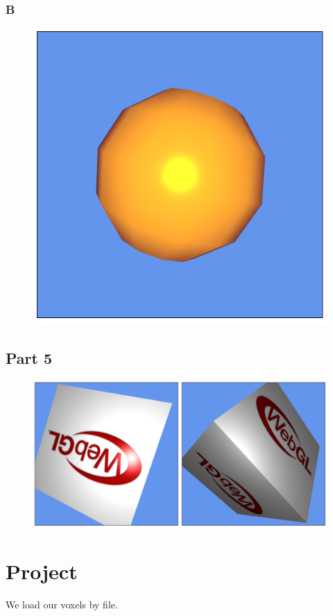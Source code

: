 \documentclass[11pt]{article}
\begin{document}
\subsubsection{B}
\begin{figure}[H]
	\centering
	\includegraphics[width=0.5\linewidth]{images/e12p4b}
	\label{fig:e12p4b}
\end{figure}

\subsection{Part 5}
\begin{figure}[H]
	\centering
	\includegraphics[width=0.5\linewidth]{images/e12p5}
	\label{fig:e12p5}
\end{figure}



\section{Project}
We load our voxels by file.
\end{document}
